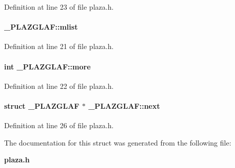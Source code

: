 Definition at line 23 of file plaza.h.\label{_PLAZGLAF_m0}
\paragraph{ \_\-PLAZGLAF::mlist}\hfill



Definition at line 21 of file plaza.h.\label{_PLAZGLAF_m1}
\paragraph{\setlength{\rightskip}{0pt plus 5cm}int \_\-PLAZGLAF::more}\hfill



Definition at line 22 of file plaza.h.\label{_PLAZGLAF_m5}
\paragraph{\setlength{\rightskip}{0pt plus 5cm}struct \_\-PLAZGLAF $\ast$ \_\-PLAZGLAF::next}\hfill



Definition at line 26 of file plaza.h.

The documentation for this struct was generated from the following file:\begin{CompactItemize}
\item 
{\bf plaza.h}\end{CompactItemize}
